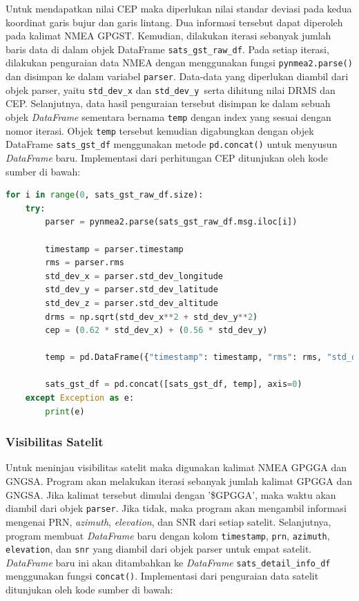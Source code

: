 Untuk mendapatkan nilai CEP maka diperlukan nilai standar deviasi pada kedua koordinat garis bujur dan garis lintang. Dua informasi tersebut dapat diperoleh pada kalimat NMEA GPGST. Kemudian, dilakukan iterasi sebanyak jumlah baris data di dalam objek DataFrame \texttt{sats\_gst\_raw\_df}. Pada setiap iterasi, dilakukan penguraian data NMEA dengan menggunakan fungsi \texttt{pynmea2.parse()} dan disimpan ke dalam variabel \texttt{parser}. Data-data yang diperlukan diambil dari objek parser, yaitu \texttt{std\_dev\_x} dan \texttt{std\_dev\_y }serta dihitung nilai DRMS dan CEP. Selanjutnya, data hasil penguraian tersebut disimpan ke dalam sebuah objek \textit{DataFrame} sementara bernama \texttt{temp} dengan index yang sesuai dengan nomor iterasi. Objek \texttt{temp} tersebut kemudian digabungkan dengan objek DataFrame \texttt{sats\_gst\_df} menggunakan metode \texttt{pd.concat()} untuk menyusun \textit{DataFrame} baru. Implementasi dari perhitungan CEP ditunjukan oleh kode sumber di bawah:

\begin{lstlisting}[language=python]
for i in range(0, sats_gst_raw_df.size):
	try:
		parser = pynmea2.parse(sats_gst_raw_df.msg.iloc[i])
		
		timestamp = parser.timestamp
		rms = parser.rms
		std_dev_x = parser.std_dev_longitude
		std_dev_y = parser.std_dev_latitude
		std_dev_z = parser.std_dev_altitude
		drms = np.sqrt(std_dev_x**2 + std_dev_y**2)
		cep = (0.62 * std_dev_x) + (0.56 * std_dev_y)
		
		temp = pd.DataFrame({"timestamp": timestamp, "rms": rms, "std_dev_x": std_dev_x, "std_dev_y": std_dev_y, "std_dev_z": std_dev_z, "drms": drms, "cep": cep}, index=[i])
		
		sats_gst_df = pd.concat([sats_gst_df, temp], axis=0)
	except Exception as e:
		print(e)
\end{lstlisting}

\subsubsection{Visibilitas Satelit}
Untuk meninjau visibilitas satelit maka digunakan kalimat NMEA GPGGA dan GNGSA. Program akan melakukan iterasi sebanyak jumlah kalimat GPGGA dan GNGSA. Jika kalimat tersebut dimulai dengan '\$GPGGA', maka waktu akan diambil dari objek \texttt{parser}. Jika tidak, maka program akan mengambil informasi mengenai PRN, \textit{azimuth}, \textit{elevation}, dan SNR dari setiap satelit. Selanjutnya, program membuat \textit{DataFrame} baru dengan kolom \texttt{timestamp}, \texttt{prn}, \texttt{azimuth}, \texttt{elevation}, dan \texttt{snr} yang diambil dari objek parser untuk empat satelit. \textit{DataFrame} baru ini akan ditambahkan ke \textit{DataFrame} \texttt{sats\_detail\_info\_df} menggunakan fungsi \texttt{concat()}. Implementasi dari penguraian data satelit ditunjukan oleh kode sumber di bawah:

